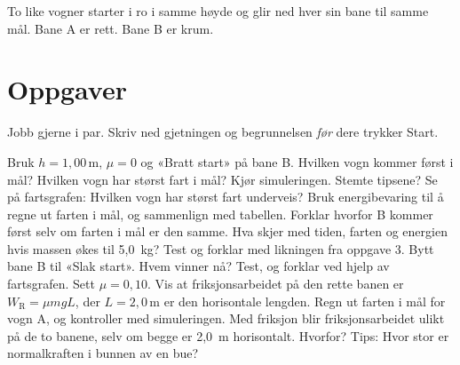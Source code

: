 \documentclass[11pt]{article}
\begin{document}

To like vogner starter i ro i samme høyde og glir ned hver sin bane til samme mål. Bane A er rett. Bane B er krum.

\section*{Oppgaver}

Jobb gjerne i par. Skriv ned gjetningen og begrunnelsen \emph{før} dere trykker Start.

\begin{oppgaveliste}
\oppgave {}Bruk $h = 1{,}00\,\mathrm{m}$, $μ = 0$ og «Bratt start» på bane B. Hvilken vogn kommer først i mål? Hvilken vogn har størst fart i mål?
\svar
\oppgave {}Kjør simuleringen. Stemte tipsene? Se på fartsgrafen: Hvilken vogn har størst fart underveis?
\svar
\oppgave {}Bruk energibevaring til å regne ut farten i mål, og sammenlign med tabellen. Forklar hvorfor B kommer først selv om farten i mål er den samme.
\svar
\oppgave {}Hva skjer med tiden, farten og energien hvis massen økes til 5,0~kg? Test og forklar med likningen fra oppgave 3.
\svar
\oppgave {}Bytt bane B til «Slak start». Hvem vinner nå? Test, og forklar ved hjelp av fartsgrafen.
\svar
\oppgave {}Sett $μ = 0{,}10$. Vis at friksjonsarbeidet på den rette banen er $W_{\mathrm{R}} = μmgL$, der $L = 2{,}0\,\mathrm{m}$ er den horisontale lengden. Regn ut farten i mål for vogn A, og kontroller med simuleringen.
\svar
\oppgave {}Med friksjon blir friksjonsarbeidet ulikt på de to banene, selv om begge er 2,0~m horisontalt. Hvorfor? Tips: Hvor stor er normalkraften i bunnen av en bue?
\svar
\end{oppgaveliste}
\end{document}
